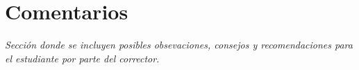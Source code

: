 \section*{Comentarios}

\textit{Sección donde se incluyen posibles obsevaciones, consejos y
recomendaciones para el estudiante por parte del corrector.}
